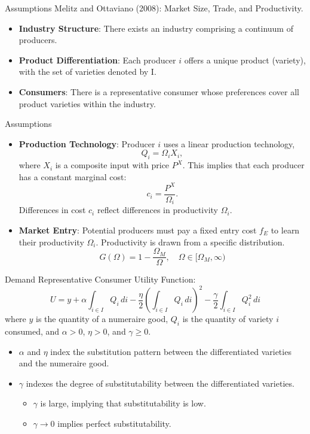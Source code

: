 \documentclass[aspectratio=169]{beamer}  %
\begin{document}
\begin{frame}{Assumptions}
    Melitz and Ottaviano (2008): Market Size, Trade, and Productivity.
    \begin{itemize}
        \item \textbf{Industry Structure}: There exists an industry comprising a continuum of producers.
        \item \textbf{Product Differentiation}: Each producer \(i\) offers a unique product (variety), with the set of varieties denoted by \(\mathrm{I}\).
        \item \textbf{Consumers}: There is a representative consumer whose preferences cover all product varieties within the industry.
    \end{itemize}
\end{frame}

\begin{frame}{Assumptions}
    \begin{itemize}
        \item \textbf{Production Technology}: Producer \(i\) uses a linear production technology, 
        \[
            Q_i = \Omega_i X_i,
        \]
        where \(X_i\) is a composite input with price \(P^X\). This implies that each producer has a constant marginal cost:
    \[
        c_i = \frac{P^X}{\Omega_i}.
    \]
    Differences in cost \(c_i\) reflect differences in productivity \(\Omega_i\).
        \item   \textbf{Market Entry}: Potential producers must pay a fixed entry cost \( f_E \) to learn their productivity \( \Omega_i \). Productivity is drawn from a specific distribution.
        \[
            G(\Omega) = 1 - \frac{\Omega_M}{\Omega}, \quad \Omega \in [\Omega_M, \infty)
        \]
    \end{itemize}
\end{frame}

\begin{frame}{Demand}
    Representative Consumer Utility Function:
    \[
    U = y + \alpha \int_{i \in I} Q_i \, di - \frac{\eta}{2} \left( \int_{i \in I} Q_i \, di \right)^2 - \frac{\gamma}{2} \int_{i \in I} Q_i^2 \, di
    \]
    where \(y\) is the quantity of a numeraire good, \(Q_i\) is the quantity of variety \(i\) consumed, and \(\alpha > 0\), \(\eta > 0\), and \(\gamma \geq 0\).
    \begin{itemize}
        \item \(\alpha\) and \(\eta\) index the substitution pattern between the differentiated varieties and the numeraire good.
        \item \(\gamma\) indexes the degree of substitutability between the differentiated varieties.
        \begin{itemize}
            \item \(\gamma\) is large, implying that substitutability is low.
            \item \(\gamma \to 0\) implies perfect substitutability.
        \end{itemize}
    \end{itemize}
\end{frame}
\end{document}
